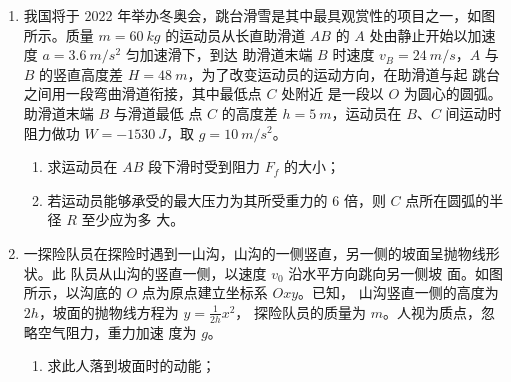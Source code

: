 \begin{enumerate}
\newpage
\item 
{}
我国将于 $ 2022 $ 年举办冬奥会，跳台滑雪是其中最具观赏性的项目之一，如图
所示。质量 $ m=60 \ kg $ 的运动员从长直助滑道 $ AB $ 的 $ A $
处由静止开始以加速度 $ a=3.6 \ m/s^{2} $ 匀加速滑下，到达
助滑道末端 $ B $ 时速度 $ v_{B} =24 \ m/s $，$ A $ 与 $ B $ 的竖直高度差
$ H=48 \ m $，为了改变运动员的运动方向，在助滑道与起
跳台之间用一段弯曲滑道衔接，其中最低点 $ C $ 处附近
是一段以 $ O $ 为圆心的圆弧。助滑道末端 $ B $ 与滑道最低
点 $ C $ 的高度差 $ h=5 \ m $，运动员在 $ B $、$ C $ 间运动时阻力做功 $ W=-1530 \ J $，取 $ g=10 \ m/s^{2} $。
\begin{enumerate}
\renewcommand{\labelenumi}{\arabic{enumi}.}
\item
求运动员在 $ AB $ 段下滑时受到阻力 $ F_{f} $ 的大小；
\item 
若运动员能够承受的最大压力为其所受重力的 $ 6 $ 倍，则 $ C $ 点所在圆弧的半径 $ R $ 至少应为多
大。



\end{enumerate}
\begin{figure}[h!]
\flushright

\end{figure}






\newpage
\item 
{}
一探险队员在探险时遇到一山沟，山沟的一侧竖直，另一侧的坡面呈抛物线形状。此
队员从山沟的竖直一侧，以速度 $ v_{0} $ 沿水平方向跳向另一侧坡
面。如图所示，以沟底的 $ O $ 点为原点建立坐标系 $ Oxy $。已知，
山沟竖直一侧的高度为 $ 2 h $，坡面的抛物线方程为 $y=\frac{1}{2 h} x^{2}$，
探险队员的质量为 $ m $。人视为质点，忽略空气阻力，重力加速
度为 $ g $。
\begin{enumerate}
\renewcommand{\labelenumi}{\arabic{enumi}.}
\item
求此人落到坡面时的动能；


\end{enumerate}
\end{enumerate}
